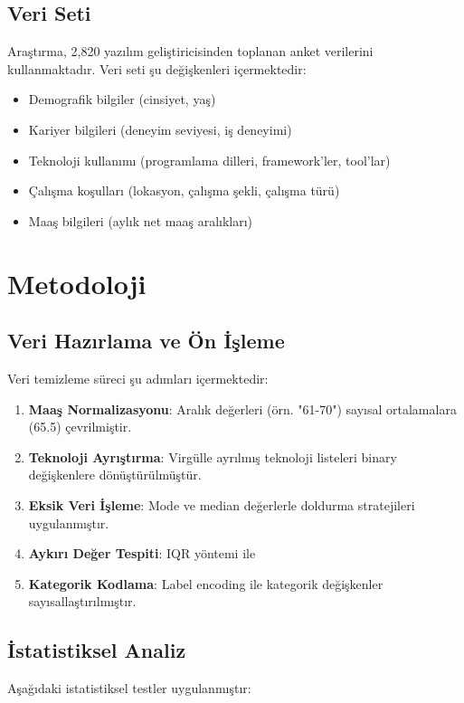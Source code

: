 \documentclass[12pt,a4paper]{article}
\begin{document}
\subsection{Veri Seti}
Araştırma, 2,820 yazılım geliştiricisinden toplanan anket verilerini kullanmaktadır. Veri seti şu değişkenleri içermektedir:
\begin{itemize}
    \item Demografik bilgiler (cinsiyet, yaş)
    \item Kariyer bilgileri (deneyim seviyesi, iş deneyimi)
    \item Teknoloji kullanımı (programlama dilleri, framework'ler, tool'lar)
    \item Çalışma koşulları (lokasyon, çalışma şekli, çalışma türü)
    \item Maaş bilgileri (aylık net maaş aralıkları)
\end{itemize}

\section{Metodoloji}

\subsection{Veri Hazırlama ve Ön İşleme}
Veri temizleme süreci şu adımları içermektedir:

\begin{enumerate}
    \item \textbf{Maaş Normalizasyonu}: Aralık değerleri (örn. "61-70") sayısal ortalamalara (65.5) çevrilmiştir.
    \item \textbf{Teknoloji Ayrıştırma}: Virgülle ayrılmış teknoloji listeleri binary değişkenlere dönüştürülmüştür.
    \item \textbf{Eksik Veri İşleme}: Mode ve median değerlerle doldurma stratejileri uygulanmıştır.
    \item \textbf{Aykırı Değer Tespiti}: IQR yöntemi ile %
    \item \textbf{Kategorik Kodlama}: Label encoding ile kategorik değişkenler sayısallaştırılmıştır.
\end{enumerate}

\subsection{İstatistiksel Analiz}
Aşağıdaki istatistiksel testler uygulanmıştır:
\end{document}
